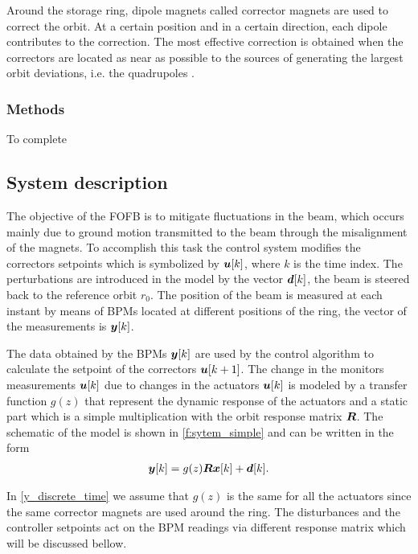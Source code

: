 Around the storage ring, dipole magnets called corrector magnets are used to correct the orbit. At a certain position and in a certain direction, each dipole contributes to the correction. The most effective correction is obtained when the correctors are located as near as possible to the sources of generating the largest orbit deviations, i.e. the quadrupoles \cite{fasthori26}.

\subsubsection{Methods}

To complete

\subsection{System description}

The objective of the FOFB is to mitigate fluctuations in the beam, which occurs mainly due to ground motion transmitted to the beam through the misalignment of the magnets. To accomplish this task the control system modifies the correctors setpoints which is symbolized by $\bm{u}[k]$, where $k$ is the time index. The perturbations are introduced in the model by the vector $\bm{d}[k]$, the beam is steered back to the reference orbit $r_0$. The position of the beam is measured at each instant by means of BPMs located at different positions of the ring, the vector of the measurements is $\bm{y}[k]$. 

The data obtained by the BPMs $\bm{y}[k]$ are used by the control algorithm to calculate the setpoint of the correctors $\bm{u}[k+1]$. The change in the monitors measurements $\bm{u}[k]$ due to changes in the actuators $\bm{u}[k]$ is modeled by a transfer function $g(z)$ that represent the dynamic response of the actuators and a static part which is a simple multiplication with the orbit response matrix $\bm{R}$. The schematic of the model is shown in \ref{f:sytem_simple} and can be written in the form 
\begin{align} \label{y_discrete_time}
    \bm{y}[k] = g(z) \bm{R} \bm{x}[k] + \bm{d}[k].
\end{align}

In \ref{y_discrete_time} we assume that $g(z)$ is the same for all the actuators since the same corrector magnets are used around the ring. The disturbances and the controller setpoints act on the BPM readings via different response matrix which will be discussed bellow.

